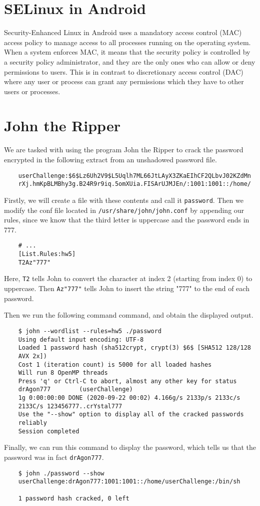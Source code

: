 \documentclass{article}
\begin{document}
\section{SELinux in Android}

Security-Enhanced Linux in Android uses a mandatory access control (MAC) access policy to manage access to all processes running on the operating system. When a system enforces MAC, it means that the security policy is controlled by a security policy administrator, and they are the only ones who can allow or deny permissions to users. This is in contrast to discretionary access control (DAC) where any user or process can grant any permissions which they have to other users or processes.

\section{John the Ripper}

We are tasked with using the program John the Ripper to crack the password encrypted in the following extract from an unshadowed password file.

\begin{verbatim}
	userChallenge:$6$Lz6Uh2V9$L5Uqlh7ML66JtLAyX3ZKaEIhCF2QLbvJ02KZdMn
	rXj.hmKpBLMBhy3g.B24R9r9iq.5omXUia.FISArUJMJEn/:1001:1001::/home/
\end{verbatim}

Firstly, we will create a file with these contents and call it \verb`password`. Then we modify the conf file located in \verb`/usr/share/john/john.conf` by appending our rules, since we know that the third letter is uppercase and the password ends in 777.

\begin{verbatim}
	# ...
	[List.Rules:hw5]
	T2Az"777"
\end{verbatim}

Here, \verb`T2` tells John to convert the character at index 2 (starting from index 0) to uppercase. Then \verb`Az"777"` tells John to insert the string "777" to the end of each password.

Then we run the following command command, and obtain the displayed output.
\begin{verbatim}
	$ john --wordlist --rules=hw5 ./password
	Using default input encoding: UTF-8
	Loaded 1 password hash (sha512crypt, crypt(3) $6$ [SHA512 128/128
	AVX 2x])
	Cost 1 (iteration count) is 5000 for all loaded hashes
	Will run 8 OpenMP threads
	Press 'q' or Ctrl-C to abort, almost any other key for status
	drAgon777        (userChallenge)
	1g 0:00:00:00 DONE (2020-09-22 00:02) 4.166g/s 2133p/s 2133c/s
	2133C/s 123456777..crYstal777
	Use the "--show" option to display all of the cracked passwords
	reliably
	Session completed
\end{verbatim}

Finally, we can run this command to display the password, which tells us that the password was in fact \verb`drAgon777`.

\begin{verbatim}
	$ john ./password --show
	userChallenge:drAgon777:1001:1001::/home/userChallenge:/bin/sh

	1 password hash cracked, 0 left
\end{verbatim}
\end{document}
